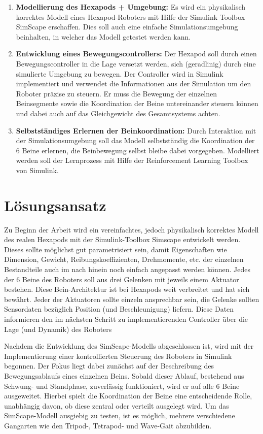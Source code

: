 \begin{enumerate}
	\item \textbf{Modellierung des Hexapods + Umgebung:} Es wird ein physikalisch korrektes Modell eines Hexapod-Roboters mit Hilfe der Simulink Toolbox SimScape erschaffen.
	Dies soll auch eine einfache Simulationsumgebung beinhalten, in welcher das Modell getestet werden kann. 
	
	\item \textbf{Entwicklung eines Bewegungscontrollers:} Der Hexapod soll durch einen Bewegungscontroller in die Lage versetzt werden, sich (geradlinig) durch eine simulierte Umgebung zu bewegen. 
	Der Controller wird in Simulink implementiert und verwendet die Informationen aus der Simulation um den Roboter präzise zu steuern.
	Er muss die Bewegung der einzelnen Beinsegmente sowie die Koordination der Beine untereinander steuern können und dabei auch auf das Gleichgewicht des Gesamtsystems achten.
	
	\item \textbf{Selbstständiges Erlernen der Beinkoordination:} Durch Interaktion mit der Simulationsumgebung soll das Modell selbstständig die Koordination der 6 Beine erlernen, die Beinbewegung selbst bleibe dabei vorgegeben.
	Modelliert werden soll der Lernprozess mit Hilfe der Reinforcement Learning Toolbox von Simulink.
	
\end{enumerate}

\section{Lösungsansatz}
Zu Beginn der Arbeit wird ein vereinfachtes, jedoch physikalisch korrektes Modell des realen Hexapods mit der Simulink-Toolbox Simscape entwickelt werden.
Dieses sollte möglichst gut parametrisiert sein, damit Eigenschaften wie Dimension, Gewicht, Reibungskoeffizienten, Drehmomente, etc. der einzelnen Bestandteile auch im nach hinein noch einfach angepasst werden können.
Jedes der 6 Beine des Roboters soll aus drei Gelenken mit jeweils einem Aktuator bestehen.
Diese Bein-Architektur ist bei Hexapods weit verbreitet und hat sich bewährt.
Jeder der Aktuatoren sollte einzeln ansprechbar sein, die Gelenke sollten Sensordaten bezüglich Position (und Beschleunigung) liefern.
Diese Daten informieren den im nächsten Schritt zu implementierenden Controller über die Lage (und Dynamik) des Roboters 

Nachdem die Entwicklung des SimScape-Modells abgeschlossen ist, wird mit der Implementierung einer kontrollierten Steuerung des Roboters in Simulink begonnen.
Der Fokus liegt dabei zunächst auf der Beschreibung des Bewegungsablaufs eines einzelnen Beins.
Sobald dieser Ablauf, bestehend aus Schwung- und Standphase, zuverlässig funktioniert, wird er auf alle 6 Beine ausgeweitet.
Hierbei spielt die Koordination der Beine eine entscheidende Rolle, unabhängig davon, ob diese zentral oder verteilt ausgelegt wird.
Um das SimScape-Modell ausgiebig zu testen, ist es möglich, mehrere verschiedene Gangarten wie den Tripod-, Tetrapod- und Wave-Gait abzubilden.

